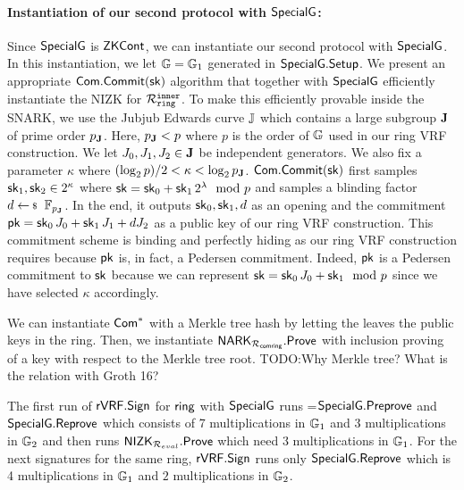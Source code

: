 \paragraph{Instantiation of our second protocol with $ {\mathsf{SpecialG}} $:} Since $ {\mathsf{SpecialG}} $ is $ {\mathsf{ZKCont}} $, we can instantiate our second protocol with $ {\mathsf{SpecialG}}$. In this instantiation, we let $ {\mathbb{G}} = \mathbb{G}_1 $ generated in $ {\mathsf{SpecialG}}.{\mathsf{Setup}} $.  
We present an appropriate $ \mathsf{Com}.\mathsf{Commit}(\mathsf{sk}) $ algorithm that together with $ {\mathsf{SpecialG}} $ efficiently instantiate the NIZK for $ \mathcal{R}_{\mathtt{ring}}^{\mathtt{inner}} $. To make this efficiently provable inside the SNARK,  we use the Jubjub Edwards curve ${\mathbb{J}}$ which contains a large subgroup ${\mathbf{J}}$ of prime order $p_{\mathbf{J}}$. Here, $p_{\mathbf{J}} < p$ where $ p $ is the order of ${\mathbb{G}}$ used in our ring VRF construction. We let $J_0,J_1,J_2 \in {\mathbf{J}}$ be independent generators. We also fix a parameter $ \kappa $ where $(\log_2 p)/2 < \kappa < \log_2 p_{\mathbf{J}}$. $ \mathsf{Com}.\mathsf{Commit}(\mathsf{sk}) $ first samples $\mathsf{sk}_1,\mathsf{sk}_2 \in 2^\kappa$  where $\mathsf{sk} = \mathsf{sk}_0 + \mathsf{sk}_1 \, 2^{\lambda} \mod p$ and samples a blinding factor $d \leftsample \F_{p_\grJ} $. In the end, it outputs $ \mathsf{sk}_0, \mathsf{sk}_1,d $ as an opening and the commitment $\mathsf{pk}=\mathsf{sk}_0\, J_0 + \mathsf{sk}_1\, J_1 + d J_2$ as a public key of our ring VRF construction. This commitment scheme is binding and perfectly hiding as our ring VRF construction requires because $ \mathsf{pk} $ is, in fact, a Pedersen commitment. Indeed, $\mathsf{pk}$ is a Pedersen commitment to $\mathsf{sk}$ because we can represent $ \mathsf{sk} = \mathsf{sk}_0\, J_0 + \mathsf{sk}_1 \mod p$ since we have selected $ \kappa $ accordingly.

We can instantiate $ \mathsf{Com}^*$ with a Merkle tree hash by letting the leaves the public keys in the ring. Then, we instantiate $ \mathsf{NARK}_{\mathcal{R}_{\mathsf{comring}}}.{\mathsf{Prove}} $ with inclusion proving of a key with respect to the Merkle tree root.
TODO:Why Merkle tree? What is the relation with Groth  16?

The first run of ${\mathsf{rVRF}}.{\mathsf{Sign}}$ for $\mathsf{ring}$ with $ {\mathsf{SpecialG}} $ runs =${\mathsf{SpecialG}}.{\mathsf{Preprove}}$ and $ {\mathsf{SpecialG}}.{\mathsf{Reprove}}$ which consists of  7 multiplications in $\mathbb{G}_1 $ and $3$ multiplications in $\mathbb{G}_2$ and then runs ${\mathsf{NIZK}}_{\mathcal{R}_{eval}}.{\mathsf{Prove}}$ which need  3 multiplications in $ \mathbb{G}_1 $.
For the next signatures for the same ring,  ${\mathsf{rVRF}}.{\mathsf{Sign}}$  runs only  ${\mathsf{SpecialG}}.{\mathsf{Reprove}}$ which is 4 multiplications in $\mathbb{G}_1 $ and $2$ multiplications in $\mathbb{G}_2$.




